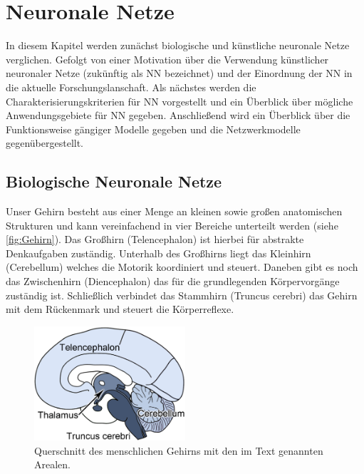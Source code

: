 

\section{Neuronale Netze}
In diesem Kapitel werden zunächst biologische und künstliche neuronale Netze verglichen. Gefolgt von einer Motivation über die Verwendung künstlicher neuronaler Netze (zukünftig als NN bezeichnet) und der Einordnung der NN in die aktuelle Forschungslanschaft. Als nächstes werden die Charakterisierungskriterien für NN vorgestellt und ein Überblick über mögliche Anwendungsgebiete für NN gegeben. Anschließend wird ein Überblick über die Funktionsweise gängiger Modelle gegeben und die Netzwerkmodelle gegenübergestellt.


\subsection{Biologische Neuronale Netze}

Unser Gehirn besteht aus einer Menge an kleinen sowie großen anatomischen Strukturen und kann vereinfachend in vier Bereiche unterteilt werden (siehe \autoref{fig:Gehirn}). Das Großhirn (Telencephalon) ist hierbei für abstrakte Denkaufgaben zuständig. Unterhalb des Großhirns liegt das Kleinhirn (Cerebellum) welches die Motorik koordiniert und steuert. Daneben gibt es noch das Zwischenhirn (Diencephalon) das für die grundlegenden Körpervorgänge zuständig ist. Schließlich verbindet das Stammhirn (Truncus cerebri) das Gehirn mit dem Rückenmark und steuert die Körperreflexe.

\begin{figure}[!htb]
    \centering
        \includegraphics[width=0.5\textwidth]{Bilder/misc/Gehirn.png}
    \caption{Querschnitt des menschlichen Gehirns mit den im Text genannten Arealen.\protect\footnotemark{}}
    \label{fig:Gehirn}
\end{figure}
\addtocounter{footnote}{-1}     %
\addtocounter{Hfootnote}{-1}    %
\wrapfigfoot{}

